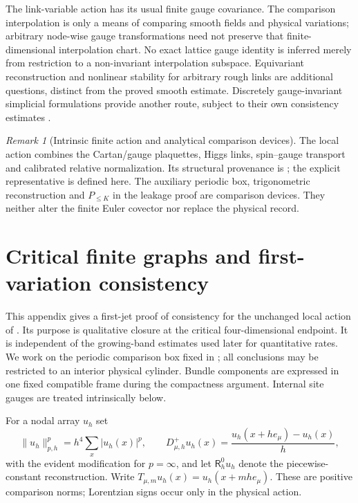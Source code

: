\documentclass[11pt]{article}
\numberwithin{equation}{section}
\theoremstyle{definition}
\theoremstyle{remark}
\newtheorem{remark}[remark]{Remark}
\newcommand{\norm}[1]{\lVert#1\rVert}
\begin{document}
The link-variable action has its usual finite gauge covariance. The comparison interpolation is only a means of comparing smooth fields and physical variations; arbitrary node-wise gauge transformations need not preserve that finite-dimensional interpolation chart. No exact lattice gauge identity is inferred merely from restriction to a non-invariant interpolation subspace. Equivariant reconstruction and nonlinear stability for arbitrary rough links are additional questions, distinct from the proved smooth estimate. Discretely gauge-invariant simplicial formulations provide another route, subject to their own consistency estimates \cite{ChristiansenHalvorsen2012}.

\begin{remark}[Intrinsic finite action and analytical comparison devices]
The local action combines the Cartan/gauge plaquettes, Higgs links,
spin--gauge transport and calibrated relative normalization. Its structural
provenance is ; the explicit representative is
defined here. The auxiliary periodic box, trigonometric reconstruction and
$P_{\le K}$ in the leakage proof are comparison devices. They neither alter
the finite Euler covector nor replace the physical record.
\end{remark}

\section{Critical finite graphs and first-variation consistency}
\label{app:native-critical-closure}

This appendix gives a first-jet proof of consistency for the unchanged local
action of .  Its purpose is qualitative closure at the
critical four-dimensional endpoint.  It is independent of the growing-band
estimates used later for quantitative rates.  We work on the periodic
comparison box fixed in ; all conclusions may be
restricted to an interior physical cylinder.  Bundle components are expressed
in one fixed compatible frame during the compactness argument.  Internal site
gauges are treated intrinsically below.

For a nodal array $u_h$ set
\begin{equation}
 \norm{u_h}_{p,h}^p=h^4\sum_x|u_h(x)|^p,
 \qquad
 D^+_{\mu,h}u_h(x)=\frac{u_h(x+h e_\mu)-u_h(x)}h,
 \label{eq:native-critical-norms}
\end{equation}
with the evident modification for $p=\infty$, and let $\mathsf R_h^0u_h$
denote the piecewise-constant reconstruction.  Write
$T_{\mu,m}u_h(x)=u_h(x+mhe_\mu)$.  These are positive comparison norms;
Lorentzian signs occur only in the physical action.
\end{document}
